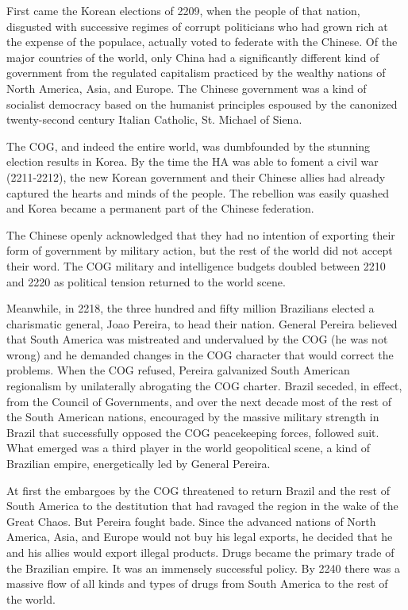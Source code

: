 \documentclass[]{article}
\begin{document}
{First came the Korean elections of 2209, when the people of that nation, disgusted with successive regimes of corrupt politicians who had grown rich at the expense of the populace, actually voted to federate with the Chinese.  Of the major countries of the world, only China had a significantly different kind of government from the regulated capitalism practiced by the wealthy nations of North America, Asia, and Europe.  The Chinese government was a kind of socialist democracy based on the humanist principles espoused by the canonized twenty-second century Italian Catholic, St.  Michael of Siena.

The COG, and indeed the entire world, was dumbfounded by the stunning election results in Korea.  By the time the HA was able to foment a civil war (2211-2212), the new Korean government and their Chinese allies had already captured the hearts and minds of the people.  The rebellion was easily quashed and Korea became a permanent part of the Chinese federation.

The Chinese openly acknowledged that they had no intention of exporting their form of government by military action, but the rest of the world did not accept their word.  The COG military and intelligence budgets doubled between 2210 and 2220 as political tension returned to the world scene.

Meanwhile, in 2218, the three hundred and fifty million Brazilians elected a charismatic general, Joao Pereira, to head their nation.  General Pereira believed that South America was mistreated and undervalued by the COG (he was not wrong) and he demanded changes in the COG character that would correct the problems.  When the COG refused, Pereira galvanized South American regionalism by unilaterally abrogating the COG charter.  Brazil seceded, in effect, from the Council of Governments, and over the next decade most of the rest of the South American nations, encouraged by the massive military strength in Brazil that successfully opposed the COG peacekeeping forces, followed suit.  What emerged was a third player in the world geopolitical scene, a kind of Brazilian empire, energetically led by General Pereira.

At first the embargoes by the COG threatened to return Brazil and the rest of South America to the destitution that had ravaged the region in the wake of the Great Chaos.  But Pereira fought bade.  Since the advanced nations of North America, Asia, and Europe would not buy his legal exports, he decided that he and his allies would export illegal products.  Drugs became the primary trade of the Brazilian empire.  It was an immensely successful policy.  By 2240 there was a massive flow of all kinds and types of drugs from South America to the rest of the world.

}
\end{document}
